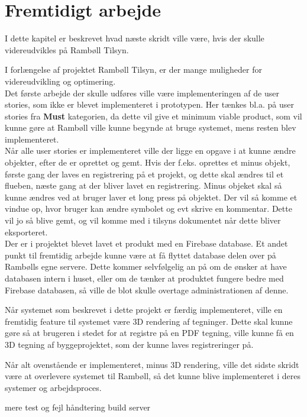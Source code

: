 \chapter{Fremtidigt arbejde}
I dette kapitel er beskrevet hvad næste skridt ville være, hvis der skulle videreudvikles på Rambøll Tilsyn.

I forlængelse af projektet Rambøll Tilsyn, er der mange muligheder for videreudvikling og optimering.\\
Det første arbejde der skulle udføres ville være implementeringen af de user stories, som ikke er blevet implementeret i prototypen. Her tænkes bl.a. på user stories fra \textbf{Must} kategorien, da dette vil give et minimum viable product, som vil kunne gøre at Rambøll ville kunne begynde at bruge systemet, mens resten blev implementeret. \\
Når alle user stories er implementeret ville der ligge en opgave i at kunne ændre objekter, efter de er oprettet og gemt. Hvis der f.eks. oprettes et minus objekt, første gang der laves en registrering på et projekt, og dette skal ændres til et flueben, næste gang at der bliver lavet en registrering. Minus objeket skal så kunne ændres ved at bruger laver et long press på objektet. Der vil så komme et vindue op, hvor bruger kan ændre symbolet og evt skrive en kommentar. Dette vil jo så blive gemt, og vil komme med i tilsyns dokumentet når dette bliver eksporteret. \\
Der er i projektet blevet lavet et produkt med en Firebase database. Et andet punkt til fremtidig arbejde kunne være at få flyttet database delen over på Rambølls egne servere. Dette kommer selvfølgelig an på om de ønsker at have databasen intern i huset, eller om de tænker at produktet fungere bedre med Firebase databasen, så ville de blot skulle overtage administrationen af denne. 

Når systemet som beskrevet i dette projekt er færdig implementeret, ville en fremtidig feature til systemet være 3D rendering af tegninger. Dette skal kunne gøre så at brugeren i stedet for at registre på en PDF tegning, ville kunne få en 3D tegning af byggeprojektet, som der kunne laves registreringer på.

Når alt ovenstående er implementeret, minus 3D rendering, ville det sidste skridt være at overlevere systemet til Rambøll, så det kunne blive implementeret i deres systemer og arbejdsproces.

mere test og fejl håndtering build server